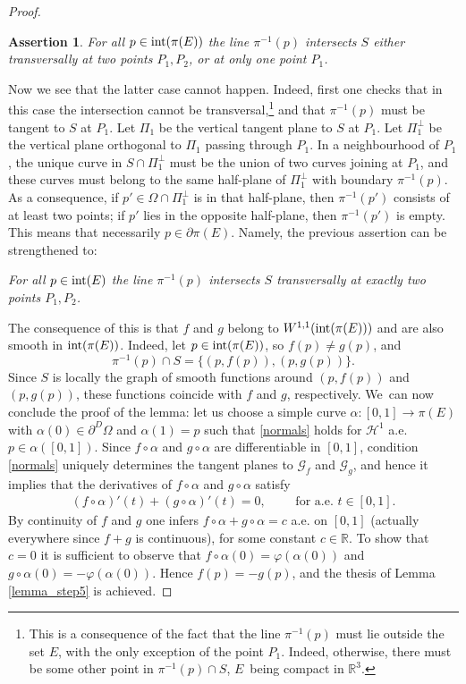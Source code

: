 \documentclass[JEP,XML,SOM,Unicode, NoFloatCountersInSection,published]{cedram}
\newcommand{\R}{\mathbb{R}}
\let\Om\Omega
\newtheorem*{assertion*}{Assertion}
\theoremstyle{definition}
\begin{document}
\begin{proof}
\begin{assertion*}
For all $p\in\textup{int}(\pi(E))$ the line $\pi^{-1}(p)$
intersects $S$ either
transversally at two points $P_1,P_2$, or at only one point $P_1$.
\end{assertion*}

Now we see that the latter case cannot happen.
Indeed, first one checks
that in this case the intersection cannot be transversal,\footnote{This is a consequence of the fact that the line $\pi^{-1}(p)$ must lie outside the set $E$, with the only exception of the point $P_1$. Indeed, otherwise, there must be some other point in $\pi^{-1}(p)\cap S$, $E$~being compact in $\R^3$.} and that $\pi^{-1}(p)$ must be tangent to $S$ at $P_1$. Let $\Pi_1$ be the
vertical tangent plane to $S$ at $P_1$.
Let $\Pi_1^\perp$ be the vertical plane orthogonal to $\Pi_1$
passing
through $P_1$. In a neighbourhood of $P_1$, the unique curve in $S\cap \Pi_1^\perp$
must be the union of two curves joining at $P_1$, and these curves must belong to
the same half-plane of $\Pi_1^\perp$ with boundary $\pi^{-1}(p)$.
As a consequence, if $p'\in \Omega\cap \Pi_1^\perp$ is in
that half-plane, then $\pi^{-1}(p')$ consists of at least two points; if $p'$ lies in the opposite half-plane, then $\pi^{-1}(p')$ is empty. This means that necessarily $p\in \partial \pi(E)$. Namely, the previous assertion can be strengthened to:

\textit{For all $p\in\textup{int}(E)$ the line $\pi^{-1}(p)$ intersects $S$ transversally at exactly two points $P_1,P_2$.}

The consequence of this is that $f$ and $g$ belong to $W^{1,1}(\textup{int}(\pi(E)))$ and are also smooth in $\textup{int}(\pi(E))$.
Indeed, let $p\in \textup{int}(\pi(E))$, so $f(p)\neq g(p)$, and
\begin{equation}\label{twopoints}
\pi^{-1}(p)\cap S=\{(p,f(p)),(p,g(p))\}.
\end{equation}
Since $S$ is locally the graph of smooth functions around $(p,f(p))$ and $(p,g(p))$,
these functions coincide with $f$ and $g$, respectively. We~can now conclude the proof
of the lemma: let us choose a simple curve $\alpha:[0,1]\to \pi(E)$ with $\alpha(0)\in \partial^D\Om$ and $\alpha(1)=p$ such that \eqref{normals} holds for $\mathcal H^1$ a.e. $p\in \alpha([0,1])$. Since $f\circ \alpha$ and $g\circ \alpha$
are differentiable in $[0,1]$, condition
\eqref{normals} uniquely determines the tangent planes to $\mathcal G_f$ and $\mathcal G_g$, and hence it implies that the derivatives of $f\circ \alpha$ and $g\circ\alpha$ satisfy
\begin{align}
(f\circ \alpha)'(t)+(g\circ \alpha)'(t)=0,\qquad \text{ for a.e. }t\in[0,1].
\end{align}
By continuity of $f$ and $g$ one infers $f\circ\alpha+g\circ\alpha=c$ a.e. on $[0,1]$ (actually everywhere since $f+g$ is continuous), for some constant $c\in\R$. To show that $c=0$ it is sufficient to observe that $f\circ\alpha(0)=\varphi(\alpha(0))$ and $g\circ\alpha(0)=-\varphi(\alpha(0))$. Hence $f(p)=-g(p)$, and the thesis of Lemma \ref{lemma_step5} is achieved.
\end{proof}
\end{document}

